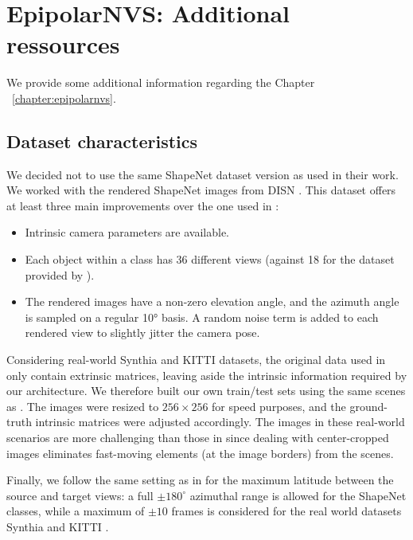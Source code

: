 \chapter{EpipolarNVS: Additional ressources}
\label{annex:epipolarnvs}

We provide some additional information regarding the Chapter ~\ref{chapter:epipolarnvs}. 

\section{Dataset characteristics}
\label{annex:epipolarnvs-dataset}

We decided not to use the same ShapeNet dataset version as \citep{kim2020novel, sun2018multiview} used in their work. We worked with the rendered ShapeNet images from DISN \citep{xu2019disn}. This dataset offers at least three main improvements over the one used in \citep{kim2020noveln,sun2018multiview}:

\begin{itemize}
    \item Intrinsic camera parameters are available. 
    \item Each object within a class has 36 different views (against 18 for the dataset provided by \cite{kim2020novel,sun2018multiview}). 
    \item The rendered images have a non-zero elevation angle, and the azimuth angle is sampled on a regular 10° basis. A random noise term is added to each rendered view to slightly jitter the camera pose. 
\end{itemize}

Considering real-world Synthia \citep{ros2016synthia} and KITTI \citep{geiger2012we} datasets, the original data used in \citep{kim2020novel} only contain extrinsic matrices, leaving aside the intrinsic information required by our architecture. We therefore built our own train/test sets using the same scenes as \citep{kim2020novel}. The images were resized to $256\times256$ for speed purposes, and the ground-truth intrinsic matrices were adjusted accordingly. The images in these real-world scenarios are more challenging than those in \citep{kim2020novel,sun2018multiview} since dealing with center-cropped images eliminates fast-moving elements (at the image borders) from the scenes.

Finally, we follow the same setting as in \citep{kim2020novel} for the maximum latitude between the source and target views: a full $\pm 180^{\circ}$ azimuthal range is allowed for the ShapeNet classes, while a maximum of $\pm 10$ frames is considered for the real world datasets Synthia \citep{ros2016synthia} and KITTI \citep{geiger2012we}.

